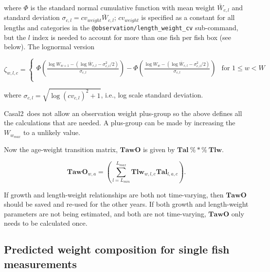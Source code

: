 \documentclass[a4paper,11pt,twoside,pdftex,draft]{article}
\newcommand{\CNAME}{Casal2}
\begin{document}
where $\Phi$ is the standard normal cumulative function with mean weight $\bar W_{c,l}$ and standard deviation $\sigma_{c,l}= cv_{weight} \bar W_{c,l}$; $cv_{weight}$ is specified as a constant for all lengths and categories  in the  \texttt{@observation/length\_weight\_cv} sub-command, but the $l$ index is needed to account for more than one fish per fish box (see below). The lognormal version

\begin{equation}
\zeta_{w,l,c} =
\begin{cases}

\Phi\left( \frac{\log W_{w+1} - \left( \log\bar W_{c,l}  - \sigma_{c,l}^2/2 \right)}{\sigma_{c,l}} \right)   - \Phi\left( \frac{\log W_{w} - \left( \log\bar W_{c,l}  - \sigma_{c,l}^2/2 \right)}{\sigma_{c,l}} \right) & \text{for } 1 \leq w < W \\

\end{cases}
\end{equation}

where $\sigma_{c,l} = \sqrt{\log(cv_{c,l})^2 + 1}$, i.e., log scale standard deviation.

\CNAME~does not allow an observation weight plus-group so the above defines all the calculations that are needed. A plus-group can be made by increasing the $W_{w_{max}}$ to a unlikely value.

Now the age-weight transition matrix, $\mathbf{TawO}$ is given by $\mathbf{Tal} \ \%*\%\ \mathbf{Tlw} $.

\begin{equation}
\mathbf{TawO}_{w,a} = \left( \sum_{l=L_{min}}^{L_{max}}  \mathbf{Tlw}_{w,l,c}  \mathbf{Tal}_{l,a,c}\right).
\end{equation}

If growth and length-weight relationships are both not time-varying, then $\mathbf{TawO}$ should be saved and re-used for the other years. If both growth and length-weight parameters are not being estimated, and both are not time-varying, $\mathbf{TawO}$ only needs to be calculated once.


\subsection{Predicted weight composition for single fish measurements}
\end{document}
